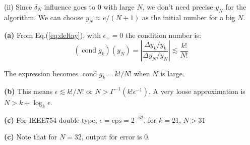 \documentclass[11pt]{article}
\numberwithin{equation}{section} %
\DeclareMathOperator{\cond}{cond}
\begin{document}
(ii) Since $\delta_N$ influence goes to $0$ with large $N$, we don't need precise 
$y_N$ for the algorithm. We can choose $y_N \approx e/(N+1)$ as the initial 
number for a big $N$. 

\textbf{(a)} From Eq.(\ref{eq:deltay}), with $\epsilon_\div = 0$
the condition number is: 
\begin{equation}
  (\cond g_k)(y_N) = \left|\frac{\Delta y_k / y_k}{\Delta y_N / y_N}\right|
  \lesssim \frac{k!}{N!}
\end{equation}

The expression becomes $\cond g_k = k!/N!$ when $N$ is large. 

\textbf{(b)} This means $\epsilon \lesssim k!/N!$ or $N >
\Gamma^{-1}(k!\epsilon^{-1})$. A very loose approximation
is $N > k + \log_k \epsilon$. 

\textbf{(c)} For IEEE754 double type, $\epsilon = \text{eps} = 2^{-52}$, 
for $k = 21$, $N > 31$

\textbf{(c)} Note that for $N=32$, output for error is 0. 

\end{document}
